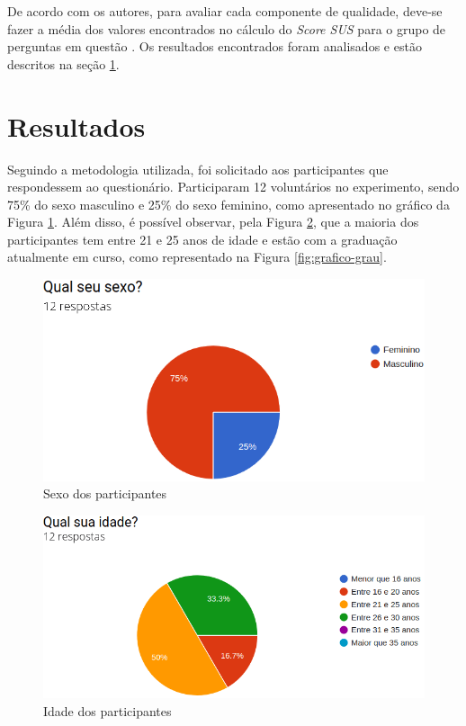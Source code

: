 \par 
De acordo com os autores, para avaliar cada componente de qualidade, deve-se fazer a média dos valores encontrados no cálculo do \textit{Score SUS} para o grupo de perguntas 
em questão \cite{nielsen199510}. Os resultados encontrados foram analisados e estão descritos na seção \ref{sec:resultados}. 

\section{Resultados}
\label{sec:resultados}

Seguindo a metodologia utilizada, foi solicitado aos participantes que respondessem ao questionário. Participaram 12 voluntários no experimento, sendo 75\% do sexo masculino e 25\% do sexo feminino, como apresentado no gráfico da Figura \ref{fig:grafico-sexo}. Além disso, 
é possível observar, pela Figura \ref{fig:grafico-idade}, que a maioria dos participantes tem entre 21 e 25 anos de idade e 
estão com a graduação atualmente em curso, como representado na Figura \ref{fig:grafico-grau}.

\begin{figure}[!ht]
    \centering
    \includegraphics[scale=0.4]{./figuras/sexo.png}
    \caption{Sexo dos participantes}
    \label{fig:grafico-sexo}
\end{figure}

\begin{figure}[!ht]
    \centering
    \includegraphics[scale=0.4]{./figuras/idade.png}
    \caption{Idade dos participantes}
    \label{fig:grafico-idade}
\end{figure}

